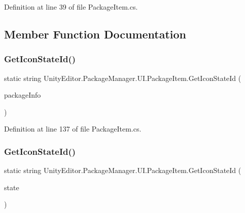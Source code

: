 Definition at line 39 of file Package\+Item.\+cs.



\subsection{Member Function Documentation}
\mbox{\label{class_unity_editor_1_1_package_manager_1_1_u_i_1_1_package_item_a01cfff7330eef99406e9ea78c64dadcd}} 
\subsubsection{\texorpdfstring{GetIconStateId()}{GetIconStateId()}\hspace{0.1cm}{\footnotesize\ttfamily [1/2]}}
{\footnotesize\ttfamily static string Unity\+Editor.\+Package\+Manager.\+U\+I.\+Package\+Item.\+Get\+Icon\+State\+Id (\begin{DoxyParamCaption}\item[{\mbox{\hyperlink{class_unity_editor_1_1_package_manager_1_1_u_i_1_1_package_info}{Package\+Info}}}]{package\+Info }\end{DoxyParamCaption})\hspace{0.3cm}{\ttfamily [static]}}



Definition at line 137 of file Package\+Item.\+cs.

\mbox{\label{class_unity_editor_1_1_package_manager_1_1_u_i_1_1_package_item_a89f95f2169471f85c9a5ad375bdbfa18}} 
\subsubsection{\texorpdfstring{GetIconStateId()}{GetIconStateId()}\hspace{0.1cm}{\footnotesize\ttfamily [2/2]}}
{\footnotesize\ttfamily static string Unity\+Editor.\+Package\+Manager.\+U\+I.\+Package\+Item.\+Get\+Icon\+State\+Id (\begin{DoxyParamCaption}\item[{\mbox{\hyperlink{namespace_unity_editor_1_1_package_manager_1_1_u_i_ab1815eb3e48074893d9dc1dc99a4a32a}{Package\+State}}}]{state }\end{DoxyParamCaption})\hspace{0.3cm}{\ttfamily [static]}}



